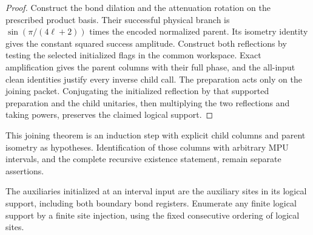 \begin{proof}\leanok
    Construct the bond dilation and the attenuation rotation on the
    prescribed product basis. Their successful physical branch is
    $\sin(\pi/(4\ell+2))$ times the encoded normalized parent.
    Its isometry identity gives the constant squared success amplitude.
    Construct both reflections by testing the selected initialized
    flags in the common workspace. Exact amplification gives the parent
    columns with their full phase, and the all-input clean identities
    justify every inverse child call.
    The preparation acts only on the joining packet. Conjugating the
    initialized reflection by that supported preparation and the child
    unitaries, then multiplying the two reflections and taking powers,
    preserves the claimed logical support.
\end{proof}

This joining theorem is an induction step with explicit child columns
and parent isometry as hypotheses. Identification of those columns with
arbitrary MPU intervals, and the complete recursive existence statement,
remain separate assertions.

\begin{definition}
    \label{def:mpu_interval_initialization}
    \leanok
    The auxiliaries initialized at an interval input are the auxiliary
    sites in its logical support, including both boundary bond
    registers. Enumerate any finite logical support by a finite site
    injection, using the fixed consecutive ordering of logical sites.
\end{definition}

